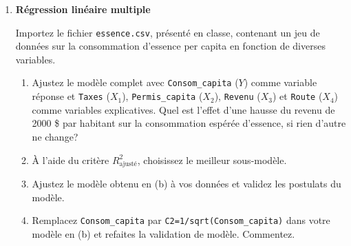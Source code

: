 \documentclass[12pt]{article}
\begin{document}
\begin{enumerate}
\newpage

{\ }
\vspace{0.05in}

\item {\bf Régression linéaire multiple}

Importez le fichier {\tt essence.csv}, présenté en classe, contenant un jeu de données sur la consommation d'essence per capita en fonction de diverses variables.
\begin{enumerate}
\item[(a)] Ajustez le modèle complet avec {\tt Consom\_capita} ($Y$) comme variable réponse et {\tt Taxes} ($X_{1}$),  {\tt Permis\_capita} ($X_{2}$), {\tt Revenu} ($X_{3}$) et {\tt Route} ($X_{4}$) comme variables explicatives. Quel est l'effet d'une hausse du revenu de 2000 \$ par habitant sur la consommation espérée d'essence, si rien d'autre ne change?
\item[(b)] À l'aide du critère $R^2_{\text{ajusté}}$, choisissez le meilleur sous-modèle.
\item[(c)] Ajustez le modèle obtenu en (b) à vos données et validez les postulats du modèle.
\item[(d)] Remplacez {\tt Consom\_capita} par {\tt C2=1/sqrt(Consom\_capita)} dans votre modèle en (b) et refaites la validation de modèle. Commentez.
\end{enumerate}

\end{enumerate}

\newpage

{\ }
\vspace{0.05in}
\end{document}
